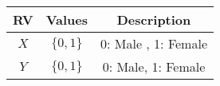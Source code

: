 
\begin{center}
\begin{tabular}{|c|c|c|}
\hline
\textbf{RV}& \textbf{Values} & \textbf{Description} \\ \hline
$X$		   & 	$\{0,1\}$		&   0: Male , 1: Female\\ \hline
$Y$ 		   & 	$\{0,1\}$	&	0: Male, 1: Female\\ \hline
\end{tabular}
\end{center}
